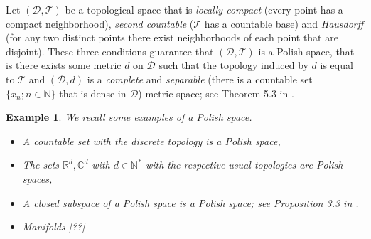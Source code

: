 \documentclass[twoside,11pt]{book}
\newtheorem{example}{Example}
\numberwithin{theorem}{chapter}
\numberwithin{definition}{chapter}
\numberwithin{proposition}{chapter}
\numberwithin{corollary}{chapter}
\numberwithin{example}{chapter}
\numberwithin{lemma}{chapter}
\numberwithin{assumption}{chapter}
\begin{document}




Let $(\mathcal{D},\mathcal{T})$ be a topological space that is \emph{locally compact} (every point has a compact neighborhood), \emph{second countable} ($\mathcal{T}$ has a countable base) and \emph{Hausdorff} (for any two distinct points there exist neighborhoods of each point that are disjoint).
 These three conditions guarantee that $(\mathcal{D},\mathcal{T})$ is a Polish space, that is there exists some metric $d$ on $\mathcal{D}$ such that the
topology induced by $d$ is equal to $\mathcal{T}$ and $(\mathcal{D},d)$ is a \emph{complete} and \emph{separable} (there is a countable set $\{x_{n}; n \in \mathbb{N}\}$ that is dense in $\mathcal{D}$)
metric space; see Theorem 5.3 in \citep{Kec95}.
\begin{example}
We recall some examples of a Polish space.
\begin{itemize}
\item A countable set with the discrete topology is a Polish space, 
\item The sets $\mathbb{R}^{d}, \mathbb{C}^{d}$ with $d \in \mathbb{N}^{*}$ with the respective usual topologies are Polish spaces,
\item A closed subspace of a Polish space is a Polish space; see Proposition 3.3 in \citep{Kec95}.
\item Manifolds [??]
\end{itemize}
\end{example}
\end{document}
